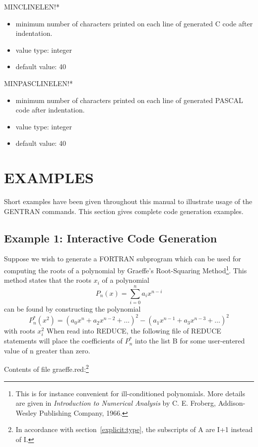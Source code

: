 \begin{describe}{MINCLINELEN!*}
\begin{itemize}
\item minimum number of characters printed on each line of generated C
code after indentation.
\item value type:  integer
\item default value:  40
\end{itemize} 
\end{describe} 
\begin{describe}{MINPASCLINELEN!*}
\begin{itemize}
\item minimum number of characters printed on each line of generated PASCAL
code after indentation.
\item value type:  integer
\item default value:  40
\end{itemize} 
\end{describe} 

\chapter{EXAMPLES}

Short examples have been given throughout this manual to illustrate
usage of the GENTRAN commands.  This section gives complete code
generation examples.

\section{Example 1:  Interactive Code Generation}
Suppose we wish to generate a FORTRAN subprogram which can be used for
computing the roots of a polynomial by Graeffe's Root-Squaring Method\footnote{
This is for instance convenient for ill-conditioned polynomials.  More
details are given in {\it Introduction to Numerical Analysis\/} by
C. E. Froberg, Addison-Wesley Publishing Company, 1966.}. This
method states that the roots $x_i$ of a polynomial
$$P_n(x) = \sum_{i=0}^{n}{a_i x^{n-i}} $$
can be found by constructing the polynomial
$$P^{*}_n\left({x^2}\right) = \left( a_0x^n + a_2x^{n-2} + \dots\right)^2 -
\left( a_1x^{n-1} + a_3x^{n-3} + \dots\right)^2$$
with roots $x_i^2$
When read into REDUCE, the following file of REDUCE statements
will place the coefficients of $P^{*}_n$
into the list B for some user-entered value of n greater than zero.

Contents of file graeffe.red:\footnote{
In accordance with section~\ref{explicit:type},
the subscripts of A are I+1 instead of I.}

